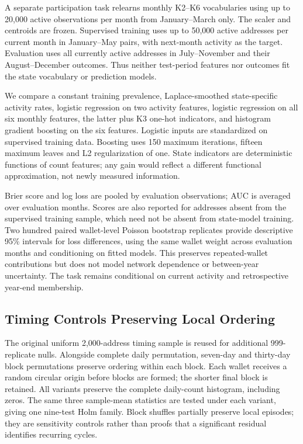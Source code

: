 \documentclass[journal,letterpaper]{IEEEtran}
\begin{document}
A separate participation task relearns monthly K2--K6 vocabularies using up to 20,000 active observations per month from January--March only. The scaler and centroids are frozen. Supervised training uses up to 50,000 active addresses per current month in January--May pairs, with next-month activity as the target. Evaluation uses all currently active addresses in July--November and their August--December outcomes. Thus neither test-period features nor outcomes fit the state vocabulary or prediction models.

We compare a constant training prevalence, Laplace-smoothed state-specific activity rates, logistic regression on two activity features, logistic regression on all six monthly features, the latter plus K3 one-hot indicators, and histogram gradient boosting on the six features. Logistic inputs are standardized on supervised training data. Boosting uses 150 maximum iterations, fifteen maximum leaves and L2 regularization of one. State indicators are deterministic functions of count features; any gain would reflect a different functional approximation, not newly measured information.

Brier score and log loss are pooled by evaluation observations; AUC is averaged over evaluation months. Scores are also reported for addresses absent from the supervised training sample, which need not be absent from state-model training. Two hundred paired wallet-level Poisson bootstrap replicates provide descriptive 95\% intervals for loss differences, using the same wallet weight across evaluation months and conditioning on fitted models. This preserves repeated-wallet contributions but does not model network dependence or between-year uncertainty. The task remains conditional on current activity and retrospective year-end membership.

\subsection{Timing Controls Preserving Local Ordering}
The original uniform 2,000-address timing sample is reused for additional 999-replicate nulls. Alongside complete daily permutation, seven-day and thirty-day block permutations preserve ordering within each block. Each wallet receives a random circular origin before blocks are formed; the shorter final block is retained. All variants preserve the complete daily-count histogram, including zeros. The same three sample-mean statistics are tested under each variant, giving one nine-test Holm family. Block shuffles partially preserve local episodes; they are sensitivity controls rather than proofs that a significant residual identifies recurring cycles.
\end{document}
